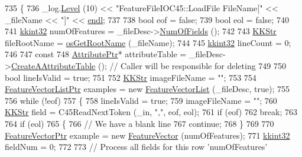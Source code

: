 \begin{DoxyCode}
735 \{
736   \_log.\hyperlink{class_k_k_b_1_1_run_log_a32cf761d7f2e747465fd80533fdbb659}{Level} (10) << \textcolor{stringliteral}{"FeatureFileIOC45::LoadFile   FileName["} << \_fileName << \textcolor{stringliteral}{"]"} << 
      \hyperlink{namespace_k_k_b_ad1f50f65af6adc8fa9e6f62d007818a8}{endl};
737 
738   \textcolor{keywordtype}{bool}  eof = \textcolor{keyword}{false};
739   \textcolor{keywordtype}{bool}  eol = \textcolor{keyword}{false};
740 
741   \hyperlink{namespace_k_k_b_a8fa4952cc84fda1de4bec1fbdd8d5b1b}{kkint32}  numOfFeatures = \_fileDesc->\hyperlink{class_k_k_m_l_l_1_1_file_desc_a07abdfb77949dee565c555c7651581c2}{NumOfFields} ();
742 
743   \hyperlink{class_k_k_b_1_1_k_k_str}{KKStr} fileRootName = \hyperlink{namespace_k_k_b_af5b668ed9902d7f93b62529664a739f0}{osGetRootName} (\_fileName);
744 
745   \hyperlink{namespace_k_k_b_a8fa4952cc84fda1de4bec1fbdd8d5b1b}{kkint32}  lineCount = 0;
746 
747   \textcolor{keyword}{const}
748     \hyperlink{class_k_k_m_l_l_1_1_attribute}{AttributePtr}*  attributeTable = \_fileDesc->\hyperlink{class_k_k_m_l_l_1_1_file_desc_ab06cc9c9bd6ef17e487d5760ab4ff5f7}{CreateAAttributeTable} ();  \textcolor{comment}{
      // Caller will be responsible for deleting}
749 
750   \textcolor{keywordtype}{bool}  lineIsValid = \textcolor{keyword}{true};
751 
752   \hyperlink{class_k_k_b_1_1_k_k_str}{KKStr}  imageFileName = \textcolor{stringliteral}{""};
753 
754   \hyperlink{class_k_k_m_l_l_1_1_feature_vector_list}{FeatureVectorListPtr}  examples = \textcolor{keyword}{new} \hyperlink{class_k_k_m_l_l_1_1_feature_vector_list}{FeatureVectorList} (\_fileDesc, \textcolor{keyword}{
      true});
755 
756   \textcolor{keywordflow}{while}  (!eof)
757   \{
758     lineIsValid = \textcolor{keyword}{true};
759     imageFileName = \textcolor{stringliteral}{""};
760     \hyperlink{class_k_k_b_1_1_k_k_str}{KKStr}  field = C45ReadNextToken (\_in, \textcolor{stringliteral}{","}, eof, eol);
761     \textcolor{keywordflow}{if}  (eof)
762       \textcolor{keywordflow}{break};
763 
764     \textcolor{keywordflow}{if}  (eol)
765     \{
766       \textcolor{comment}{// We have a blank line}
767       \textcolor{keywordflow}{continue};
768     \}
769 
770     \hyperlink{class_k_k_m_l_l_1_1_feature_vector}{FeatureVectorPtr}  example = \textcolor{keyword}{new} \hyperlink{class_k_k_m_l_l_1_1_feature_vector}{FeatureVector} (numOfFeatures);
771     \hyperlink{namespace_k_k_b_a8fa4952cc84fda1de4bec1fbdd8d5b1b}{kkint32}  fieldNum = 0;
772 
773     \textcolor{comment}{// Process all fields for this row  'numOfFeatures'}

\end{DoxyCode}
